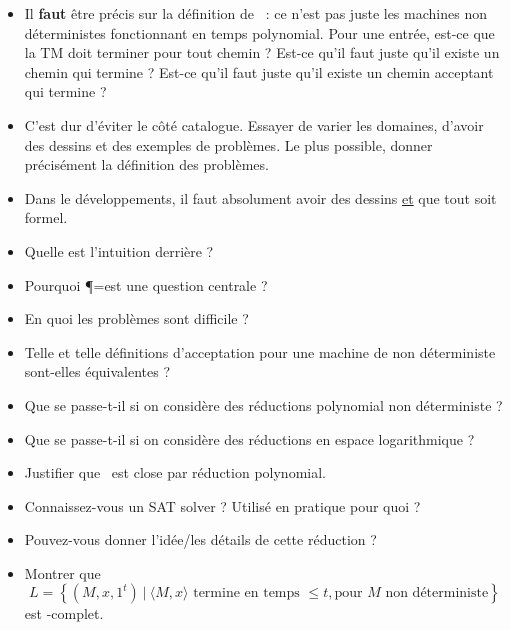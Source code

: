 \documentclass{agregfiche}
\begin{document}
\secpieges

\begin{itemize}
	\item Il \textbf{faut} être précis sur la définition de \NP\ : ce 
	n'est 
	pas juste les machines non déterministes fonctionnant en temps 
	polynomial. Pour une 
	entrée, est-ce que la TM doit terminer pour tout chemin ? Est-ce 
	qu'il faut juste qu'il existe un chemin qui termine ? Est-ce 
	qu'il faut juste qu'il existe un chemin acceptant qui termine ?
    \item C'est dur d'éviter le côté catalogue. Essayer de varier les 
    domaines, d'avoir des dessins et des exemples de problèmes. Le 
    plus possible, donner précisément la définition des problèmes.
    \item Dans le développements, il faut absolument avoir des 
    dessins \underline{et} que tout soit formel.
\end{itemize}

\secquestionsclassiques

\begin{itemize}
	\item Quelle est l'intuition derrière \NP? 
    \item Pourquoi \P=\NP est une question centrale ?
    \item En quoi les problèmes \NP sont difficile ?
    \item Telle et telle définitions d'acceptation pour une machine 
    de  non déterministe sont-elles équivalentes ?
    \item Que se passe-t-il si on considère des réductions polynomial 
    non déterministe ?
    \item Que se passe-t-il si on considère des réductions en espace 
    logarithmique ?
    \item Justifier que \NP\ est close par réduction polynomial.
    \item Connaissez-vous un SAT solver ? Utilisé en pratique pour 
    quoi ?
    \item Pouvez-vous donner l'idée/les détails de cette réduction ?
    \item Montrer que
\[
            L = \left\{ (M, x, 1^t) ~|~ \langle M, x \rangle \text{ 
            termine en
                temps  }\leq t, \text{pour }M \text{ non déterministe}
            \right\}
\]
est \NP-complet.

\end{itemize}

\secreferences
\end{document}
